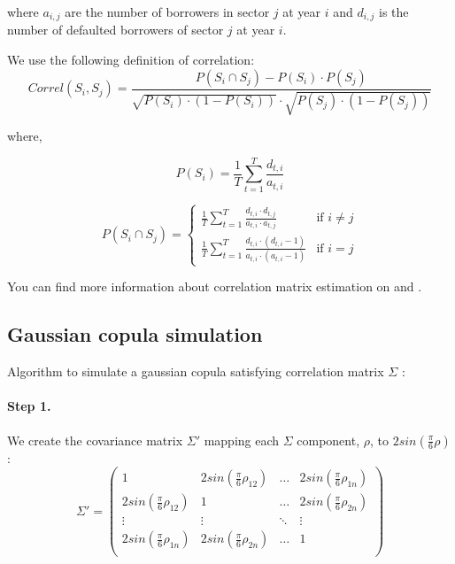 \documentclass[a4paper,12pt,final]{article}
\begin{document}
where $a_{i,j}$ are the number of borrowers in sector $j$ at year $i$ and
$d_{i,j}$ is the number of defaulted borrowers of sector $j$ at year $i$.
\newline

We use the following definition of correlation:
\begin{displaymath}
Correl(S_i,S_j) = \frac{P(S_i \cap S_j) - P(S_i) \cdot P(S_j)}{\sqrt{P(S_i) \cdot (1-P(S_i))} \cdot \sqrt{P(S_j) \cdot (1-P(S_j))}}
\end{displaymath}

where,

\begin{displaymath}
P(S_i) = \frac{1}{T} \sum_{t=1}^{T} \frac{d_{t,i}}{a_{t,i}}
\end{displaymath}

\begin{displaymath}
P(S_i \cap S_j) = \left\{
\begin{array}{ll}
\frac{1}{T} \sum_{t=1}^{T} \frac{d_{t,i} \cdot d_{t,j}}{a_{t,i} \cdot a_{t,j}} & \textrm{if  } i \neq j \\
\frac{1}{T} \sum_{t=1}^{T} \frac{d_{t,i} \cdot (d_{t,i}-1)}{a_{t,i} \cdot (a_{t,i}-1)} & \textrm{if  } i = j
\end{array}
\right.
\end{displaymath}

You can find more information about correlation matrix estimation on 
\cite{correlations:ubs} and \cite{correlations:cmetrics}.

\subsection{Gaussian copula simulation}
\label{ap:gaussiancopu}
Algorithm to simulate a gaussian copula satisfying correlation matrix $\Sigma$ 
\cite{copu:wang} \cite{copu:pricing}:

\paragraph{Step 1.} We create the covariance matrix $\Sigma'$ mapping each 
$\Sigma$ component, $\rho$, to $2 sin(\frac{\pi}{6} \rho)$:
\begin{displaymath}
\Sigma' = \left( 
\begin{array}{cccc}
1                              & 2 sin(\frac{\pi}{6} \rho_{12}) & \ldots & 2 sin(\frac{\pi}{6} \rho_{1n}) \\
2 sin(\frac{\pi}{6} \rho_{12}) & 1                              & \ldots & 2 sin(\frac{\pi}{6} \rho_{2n}) \\
\vdots                         & \vdots                         & \ddots & \vdots                         \\
2 sin(\frac{\pi}{6} \rho_{1n}) & 2 sin(\frac{\pi}{6} \rho_{2n}) & \ldots & 1                              \\
\end{array}
\right)
\end{displaymath}
\end{document}
